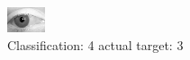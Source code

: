 \begin{figure}[h!]
\begin{center}
\includegraphics[width=0.60\columnwidth]{figures/ID2811_class_4_target_3.png}
\end{center}
\caption{ Classification: 4 actual target: 3}
\label{fig:ID2811_class_4_target_3}
\end{figure}
